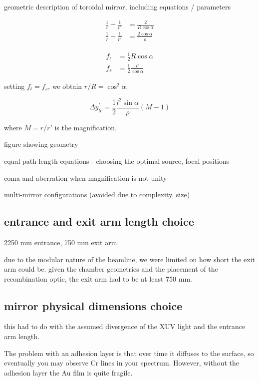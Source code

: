 geometric description of toroidal mirror, including equations / parameters

\begin{align}
\frac{1}{r} + \frac{1}{r'} &= \frac{2}{R \cos \alpha} \\
\frac{1}{r} + \frac{1}{r'} &= \frac{2 \cos \alpha}{\rho}
\end{align}

\begin{align}
f_t &= \frac{1}{2} R \cos \alpha \\
f_s &= \frac{1}{2} \frac{\rho}{\cos \alpha}
\end{align}

setting $f_t = f_s$, we obtain $r/R = \cos^2 \alpha$.

\begin{equation}
\Delta y^{'}_{lc} = \frac{1}{2} \frac{l^2 \sin \alpha}{\rho} (M-1)
\end{equation}

where $M=r/r'$ is the magnification.

figure showing geometry

equal path length equations - choosing the optimal source, focal positions

coma and aberration when magnification is not unity

multi-mirror configurations (avoided due to complexity, size)




\subsection{entrance and exit arm length choice}
2250 mm entrance, 750 mm exit arm.

due to the modular nature of the beamline, we were limited on how short the exit arm could be. given the chamber geometries and the placement of the recombination optic, the exit arm had to be at least 750 mm. 

\subsection{mirror physical dimensions choice}
this had to do with the assumed divergence of the XUV light and the entrance arm length.



The problem with an adhesion layer is that over time it diffuses to the surface, so eventually you may observe Cr lines in your spectrum.  However, without the adhesion layer the Au film is quite fragile.  


